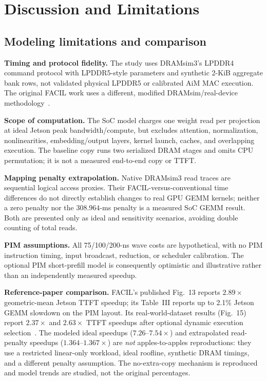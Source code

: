 \documentclass[conference,10pt]{IEEEtran}
\begin{document}
\section{Discussion and Limitations}
\subsection{Modeling limitations and comparison}
\textbf{Timing and protocol fidelity.} The study uses DRAMsim3's LPDDR4
command protocol with LPDDR5-style parameters and synthetic 2-KiB
aggregate bank rows, not validated physical LPDDR5 or calibrated
AiM MAC execution. The original FACIL work uses a different, modified
DRAMsim/real-device methodology~\cite{facil}.

\textbf{Scope of computation.} The SoC model charges one weight read
per projection at ideal Jetson peak bandwidth/compute, but excludes
attention, normalization, nonlinearities, embedding/output layers,
kernel launch, caches, and overlapping execution. The baseline copy
runs two serialized DRAM stages and omits CPU permutation; it is not a
measured end-to-end copy or TTFT.

\textbf{Mapping penalty extrapolation.} Native DRAMsim3 read traces
are sequential logical access proxies. Their FACIL-versus-conventional
time differences do not directly establish changes to real GPU GEMM
kernels; neither a zero penalty nor the $308.964$-ms penalty is a
measured SoC GEMM result. Both are presented only as ideal and
sensitivity scenarios, avoiding double counting of total reads.

\textbf{PIM assumptions.} All 75/100/200-ns wave costs are hypothetical,
with no PIM instruction timing, input broadcast, reduction, or scheduler
calibration. The optional PIM short-prefill model is consequently
optimistic and illustrative rather than an independently measured
speedup.

\textbf{Reference-paper comparison.} FACIL's published Fig.~13 reports
$2.89\times$ geometric-mean Jetson TTFT speedup; its Table~III
reports up to 2.1\% Jetson GEMM slowdown on the PIM layout. Its
real-world-dataset results (Fig.~15) report $2.37\times$ and
$2.63\times$ TTFT speedups after optional dynamic execution
selection~\cite{facil}. The modeled ideal speedups ($7.26$--$7.54\times$)
and extrapolated read-penalty speedups ($1.364$--$1.367\times$) are
\emph{not} apples-to-apples reproductions: they use a restricted
linear-only workload, ideal roofline, synthetic DRAM timings, and a
different penalty assumption. The no-extra-copy mechanism is reproduced
and model trends are studied, not the original percentages.
\end{document}
